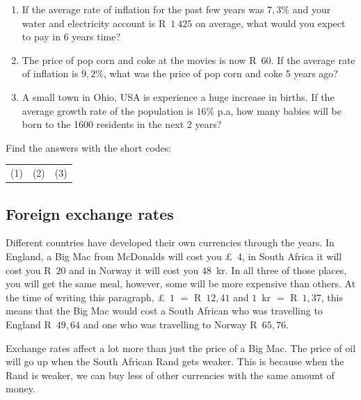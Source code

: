 \begin{exercises}{}{
    \begin{enumerate}[label=\textbf{\arabic*}.]
	\item If the average rate of inflation for the past few years was $7,3\%$ and your water and electricity account is R~$1~425$ on average, what would you expect to pay in 6 years time?

	\item The price of pop corn and coke at the movies is now R~$60$. If the average rate of inflation is $9,2\%$, what was the price of pop corn and coke 5 years ago?

	\item A small town in Ohio, USA is experience a huge increase in births. If the average growth rate of the population is $16\%$ p.a, how many babies will be born to the 1600 residents in the next 2 years?\\
    \end{enumerate}

    Find the answers with the short codes:\\
    \begin{tabularx}{\textwidth}{ XXX }
	(1)	&	(2)	&	(3)\\
    \end{tabularx}
}
\end{exercises}



\subsection{Foreign exchange rates}

Different countries have developed their own currencies through the years. In England, a Big Mac from McDonalds will cost you £~$4$, in South Africa it will cost you R~$20$ and in Norway it will cost you $48$~kr. In all three of those places, you will get the same meal, however, some will be more expensive than others. At the time of writing this paragraph, £~$1$ $=$ R~$12,41$ and $1$~kr $=$ R~$1,37$, this means that the Big Mac would cost a South African who was travelling to England R~$49,64$ and one who was travelling to Norway R~$65,76$.\par

Exchange rates affect a lot more than just the price of a Big Mac. The price of oil will go up when the South African Rand gets weaker. This is because when the Rand is weaker, we can buy less of other currencies with the same amount of money.\par

